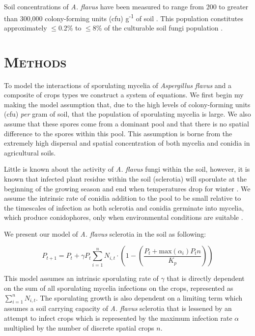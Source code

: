 \documentclass[a4paper,12pt]{article}
\let\cite\shortcite %
\begin{document}
Soil concentrations of \emph{A. flavus} have been measured to range from 200 to greater than 300,000 colony-forming units (cfu) g\textsuperscript{-1} of soil \cite{Abbas2004}.
This population constitutes approximately $\leq$0.2\% to $\leq$8\% of the culturable soil fungi population \cite{Abbas2009}.



\section*{\upshape\textsc{Methods}}

To model the interactions of sporulating mycelia of \emph{Aspergillus flavus} and a composite of crops types we construct a system of equations.
We first begin my making the model assumption that, due to the high levels of colony-forming units (cfu) \emph{per} gram of soil, that the population of sporulating mycelia is large.
We also assume that these spores come from a dominant pool and that there is no spatial difference to the spores within this pool.
This assumption is borne from the extremely high dispersal and spatial concentration of both mycelia and conidia in agricultural soils.

Little is known about the activity of \emph{A. flavus} fungi within the soil, however, it is known that infected plant residue within the soil (sclerotia) will sporulate at the beginning of the growing season and end when temperatures drop for winter \cite{Horn2007}.
We assume the intrinsic rate of conidia addition to the pool to be small relative to the timescales of infection as both sclerotia and conidia germinate into mycelia, which produce conidophores, only when environmental conditions are suitable \cite{Wicklow1993}.

We present our model of \emph{A. flavus} sclerotia in the soil as following:

$$P_{t + 1} = P_{t} + \gamma P_{t} \sum\limits_{i=1}^n N_{i,t} \cdot \left(1 - \left( \frac{P_{t} + \textrm{max}(\alpha_{i})P_{t}n}{K_{p}}\right)\right)$$

\noindent
This model assumes an intrinsic sporulating rate of $\gamma$ that is directly dependent on the sum of all sporulating mycelia infections on the crops, represented as $\sum\limits_{i=1}^n N_{i,t}$.
The sporulating growth is also dependent on a limiting term which assumes a soil carrying capacity of \emph{A. flavus} sclerotia that is lessened by an attempt to infect crops which is represented by the maximum infection rate $\alpha$ multiplied by the number of discrete spatial crops $n$.
\end{document}
